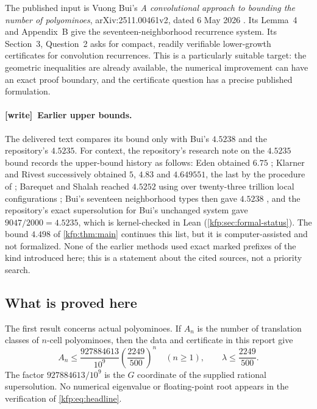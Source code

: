 \documentclass[11pt,a4paper]{article}
\theoremstyle{definition}
\theoremstyle{remark}
\newcommand{\wtag}{\textsf{\small[write]}}
\begin{document}
The published input is Vuong Bui's \emph{A convolutional approach to bounding
the number of polyominoes}, arXiv:2511.00461v2, dated 6 May 2026
\cite{bui}. Its Lemma~4 and Appendix~B give the seventeen-neighborhood
recurrence system. Its Section~3, Question~2 asks for compact, readily
verifiable lower-growth certificates for convolution recurrences.
This is a particularly suitable target: the geometric inequalities are
already available, the numerical improvement can have an exact proof
boundary, and the certificate question has a precise published formulation.

\paragraph{\wtag\ Earlier upper bounds.}
The delivered text compares its bound only with Bui's $4.5238$ and the
repository's $4.5235$. For context, the repository's research note on the
$4.5235$ bound \cite{repobound} records the upper-bound history as follows:
Eden obtained $6.75$ \cite{eden}; Klarner and Rivest successively obtained
$5$, $4.83$ and $4.649551$, the last by the procedure of \cite{klarnerrivest};
Barequet and Shalah reached $4.5252$ using over twenty-three trillion local
configurations \cite{barequetshalah}; Bui's seventeen neighborhood types then
gave $4.5238$ \cite{bui}, and the repository's exact supersolution for Bui's
unchanged system gave $9047/2000=4.5235$, which is kernel-checked in Lean
(\cref{kfp:sec:formal-status}). The bound $4.498$ of \cref{kfp:thm:main}
continues this list, but it is computer-assisted and not formalized.
None of the earlier methods used exact marked prefixes of the kind
introduced here; this is a statement about the cited sources, not a priority
search.

\subsection{What is proved here}
The first result concerns actual polyominoes. If $A_n$ is the number of
translation classes of $n$-cell polyominoes, then the data and certificate in
this report give
\begin{equation}\label{kfp:eq:headline}
 A_n\leq\frac{927884613}{10^9}\left(\frac{2249}{500}\right)^n
 \quad(n\geq1),\qquad
 \lambda\leq\frac{2249}{500}.
\end{equation}
The factor $927884613/10^9$ is the $G$ coordinate of the supplied rational
supersolution. No numerical eigenvalue or floating-point root appears in the
verification of \eqref{kfp:eq:headline}.
\end{document}
